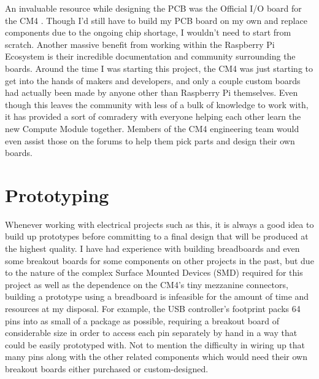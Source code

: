 An invaluable resource while designing the PCB was the Official I/O board for the CM4 \cite{rpi_cm4_io}.
Though I'd still have to build my PCB board on my own and replace components due to the ongoing chip shortage, I wouldn't need to start from scratch.
Another massive benefit from working within the Raspberry Pi Ecosystem is their incredible documentation and community surrounding the boards.
Around the time I was starting this project, the CM4 was just starting to get into the hands of makers and developers, and only a couple custom boards had actually been made by anyone other than Raspberry Pi themselves.
Even though this leaves the community with less of a bulk of knowledge to work with, it has provided a sort of comradery with everyone helping each other learn the new Compute Module together.
Members of the CM4 engineering team would even assist those on the forums to help them pick parts and design their own boards.


\section{Prototyping}\label{sec:Prototyping}

Whenever working with electrical projects such as this, it is always a good idea to build up prototypes before committing to a final design that will be produced at the highest quality.
I have had experience with building breadboards and even some breakout boards for some components on other projects in the past, but due to the nature of the complex Surface Mounted Devices (SMD) required for this project as well as the dependence on the CM4's tiny mezzanine connectors, building a prototype using a breadboard is infeasible for the amount of time and resources at my disposal.
For example, the USB controller's footprint packs 64 pins into as small of a package as possible, requiring a breakout board of considerable size in order to access each pin separately by hand in a way that could be easily prototyped with.
Not to mention the difficulty in wiring up that many pins along with the other related components which would need their own breakout boards either purchased or custom-designed.

